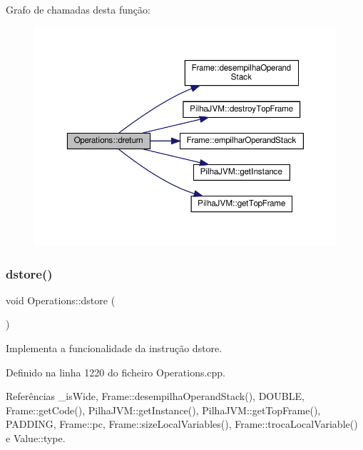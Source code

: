 Grafo de chamadas desta função\+:\nopagebreak
\begin{figure}[H]
\begin{center}
\leavevmode
\includegraphics[width=350pt]{classOperations_a85ce8267820ffcc1e1530d533545c9f3_cgraph}
\end{center}
\end{figure}
\mbox{\label{classOperations_a83fb57afed30b1223f8485492f9d9958}} 
\subsubsection{\texorpdfstring{dstore()}{dstore()}}
{\footnotesize\ttfamily void Operations\+::dstore (\begin{DoxyParamCaption}{ }\end{DoxyParamCaption})\hspace{0.3cm}{\ttfamily [private]}}



Implementa a funcionalidade da instrução dstore. 



Definido na linha 1220 do ficheiro Operations.\+cpp.



Referências \+\_\+is\+Wide, Frame\+::desempilha\+Operand\+Stack(), D\+O\+U\+B\+LE, Frame\+::get\+Code(), Pilha\+J\+V\+M\+::get\+Instance(), Pilha\+J\+V\+M\+::get\+Top\+Frame(), P\+A\+D\+D\+I\+NG, Frame\+::pc, Frame\+::size\+Local\+Variables(), Frame\+::troca\+Local\+Variable() e Value\+::type.



